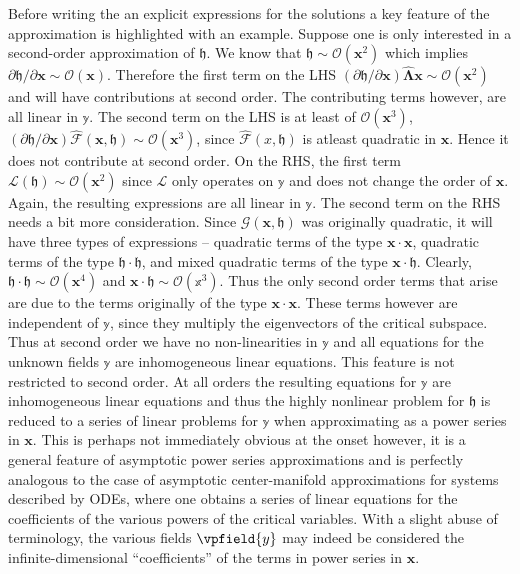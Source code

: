 Before writing the an explicit expressions for the solutions a key feature of the approximation is highlighted with an example. Suppose one is only interested in a second-order approximation of $\mathfrak{h}$. We know that $\mathfrak{h} \sim \mathcal{O}(\mathbf{x}^{2})$ which implies $\partial \mathfrak{h}/\partial \mathbf{x} \sim \mathcal{O}(\mathbf{x})$. Therefore the first term on the LHS $(\partial \mathfrak{h}/\partial \mathbf{x})\mathbf{\widehat{\Lambda}}\mathbf{x} \sim \mathcal{O}(\mathbf{x}^{2})$ and will have contributions at second order. The contributing terms however, are all linear in $\mathbb{y}$. The second term on the LHS is at least of $\mathcal{O}(\mathbf{x}^{3})$, \ie $(\partial \mathfrak{h}/\partial \mathbf{x})\mathcal{\widehat{F}}(\mathbf{x},\mathfrak{h}) \sim \mathcal{O}(\mathbf{x}^{3})$, since $\mathcal{\widehat{F}}(x,\mathfrak{h})$ is atleast quadratic in $\mathbf{x}$. Hence it does not contribute at second order. On the RHS, the first term $\mathcal{L}(\mathfrak{h}) \sim \mathcal{O}(\mathbf{x}^{2})$ since $\mathcal{L}$ only operates on $\mathbb{y}$ and does not change the order of $\mathbf{x}$. Again, the resulting expressions are all linear in $\mathbb{y}$. The second term on the RHS needs a bit more consideration. Since $\mathcal{G}(\mathbf{x},\mathfrak{h})$ was originally quadratic, it will have three types of expressions -- quadratic terms of the type $\mathbf{x}\cdot\mathbf{x}$, quadratic terms of the type $\mathfrak{h}\cdot\mathfrak{h}$, and mixed quadratic terms of the type $\mathbf{x}\cdot\mathfrak{h}$. Clearly, $\mathfrak{h}\cdot\mathfrak{h} \sim \mathcal{O}(\mathbf{x}^{4})$ and $\mathbf{x}\cdot\mathfrak{h} \sim \mathcal{O}(\mathbb{x}^{3})$. Thus the only second order terms that arise are due to the terms originally of the type $\mathbf{x}\cdot\mathbf{x}$. These terms however are independent of $\mathbb{y}$, since they multiply the eigenvectors of the critical subspace. Thus at second order we have no non-linearities in $\mathbb{y}$ and all equations for the unknown fields $\mathbb{y}$ are inhomogeneous linear equations. This feature is not restricted to second order. At all orders the resulting equations for $\mathbb{y}$ are inhomogeneous linear equations and thus the highly nonlinear problem for $\mathfrak{h}$ is reduced to a series of linear problems for $\mathbb{y}$ when approximating as a power series in $\mathbf{x}$. This is perhaps not immediately obvious at the onset however, it is a general feature of asymptotic power series approximations and is perfectly analogous to the case of asymptotic center-manifold approximations for systems described by ODEs, where one obtains a series of linear equations for the coefficients of the various powers of the critical variables. With a slight abuse of terminology, the various fields $\vpfield{y}$ may indeed be considered the infinite-dimensional ``coefficients'' of the terms in power series in $\mathbf{x}$. 

